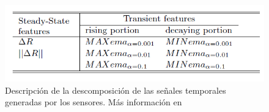 \begin{figure}
	\centering
	\includegraphics[width=0.95\linewidth]{../py_imgs/tab_features}
	\caption[Descomposición de las señales temporales]{Descripción de la descomposición de las señales temporales generadas por los sensores. Más información en \protect\cite{Vergara2011}}
	\label{fig:tabfeatures}
\end{figure}
